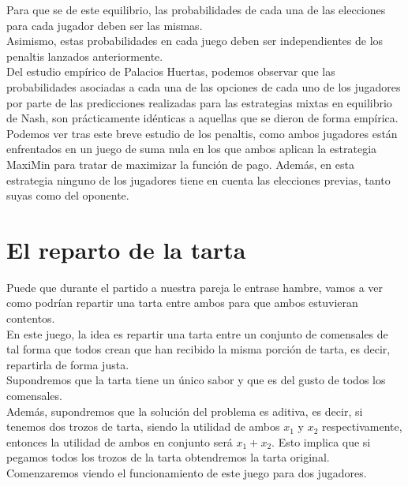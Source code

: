 \documentclass[10pt,a4paper]{book}
\begin{document}
Para que se de este equilibrio, las probabilidades de cada una de las elecciones para cada jugador deben ser las mismas.\\
Asimismo, estas probabilidades en cada juego deben ser independientes de los penaltis lanzados anteriormente.\\

Del estudio empírico de Palacios Huertas, podemos observar que las probabilidades asociadas a cada una de las opciones de cada uno de los jugadores por parte de las predicciones realizadas para las estrategias mixtas en equilibrio de Nash, son prácticamente idénticas a aquellas que se dieron de forma empírica.\\



Podemos ver tras este breve estudio de los penaltis, como ambos jugadores están enfrentados en un juego de suma nula en los que ambos aplican la estrategia MaxiMin para tratar de maximizar la función de pago. Además, en esta estrategia ninguno de los jugadores tiene en cuenta las elecciones previas, tanto suyas como del oponente.\\




\section{El reparto de la tarta}

Puede que durante el partido a nuestra pareja le entrase hambre, vamos a ver como podrían repartir una tarta entre ambos para que ambos estuvieran contentos.\\

En este juego, la idea es repartir una tarta entre un conjunto de comensales de tal forma que todos crean que han recibido la misma porción de tarta, es decir, repartirla de forma justa.\\

Supondremos que la tarta tiene un único sabor y que es del gusto de todos los comensales.\\

Además, supondremos que la solución del problema es aditiva, es decir, si tenemos dos trozos de tarta, siendo la utilidad de ambos $x_1$ y $x_2$ respectivamente, entonces la utilidad de ambos en conjunto será $x_1 + x_2$. Esto implica que si pegamos todos los trozos de la tarta obtendremos la tarta original.\\

Comenzaremos viendo el funcionamiento de este juego para dos jugadores.\\
\end{document}
